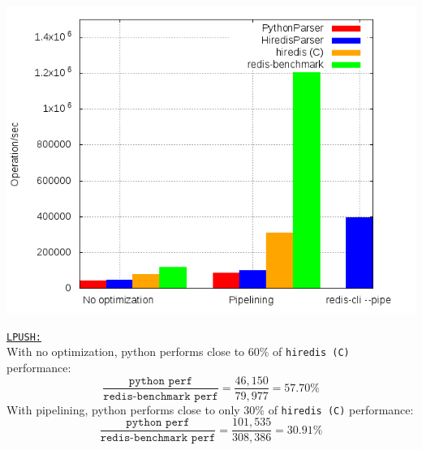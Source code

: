 \documentclass[a4paper, 11pt]{report}
\begin{document}
\newpage

\begin{minipage}{0.55\linewidth}
    \includegraphics[width=1.07\linewidth]{plots/pushing.png}
\end{minipage}
\begin{minipage}{0.4\linewidth}
    \underline{\texttt{LPUSH:}}\\

    With no optimization, python performs close to 60\% of \texttt{hiredis (C)} performance:
    $$\frac{\texttt{python perf}}{\texttt{redis-benchmark perf}}=\frac{46,150}{79,977}=57.70\%$$
    With pipelining, python performs close to only 30\% of \texttt{hiredis (C)} performance:
    $$\frac{\texttt{python perf}}{\texttt{redis-benchmark perf}}=\frac{101,535}{308,386}=30.91\%$$
\end{minipage}
\end{document}
